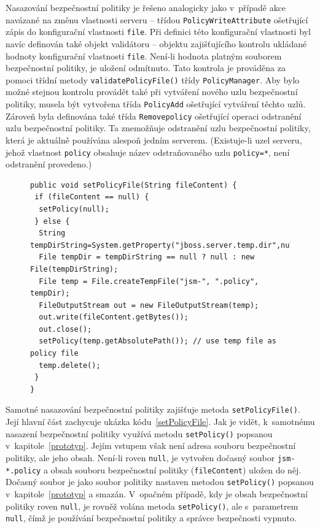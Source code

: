 Nasazování bezpečnostní politiky je řešeno analogicky jako v~případě akce navázané na změnu vlastnosti serveru -- třídou {\tt PolicyWriteAttribute} ošetřující zápis do konfigurační vlastnosti {\tt file}.
Při definici této konfigurační vlastnosti byl navíc definován také objekt validátoru -- objektu zajišťujícího kontrolu ukládané hodnoty konfigurační vlastnosti {\tt file}. Není-li hodnota platným souborem bezpečnostní politiky, je uložení odmítnuto. Tato kontrola je prováděna za pomoci třídní metody {\tt validatePolicyFile()} třídy {\tt PolicyManager}.
Aby bylo možné stejnou kontrolu provádět také při vytváření nového uzlu bezpečnostní politiky, musela být vytvořena třída {\tt PolicyAdd} ošetřující vytváření těchto uzlů.
Zároveň byla definována také třída {\tt Removepolicy} ošetřující operaci odstranění uzlu bezpečnostní politiky. Ta znemožňuje odstranění uzlu bezpečnostní politiky, která je aktuálně používána alespoň jedním serverem. (Existuje-li uzel serveru, jehož vlastnost {\tt policy} obsahuje název odstraňovaného uzlu {\tt policy=*}, není odstranění provedeno.)

\begin{figure}[tbh]
\begin{lstlisting}[caption=Klíčová část metody {\tt setPolicyFile()} třídy {\tt PolicyManager}, label=setPolicyFile]
public void setPolicyFile(String fileContent) {
 if (fileContent == null) {
  setPolicy(null);
 } else {
  String tempDirString=System.getProperty("jboss.server.temp.dir",null);
  File tempDir = tempDirString == null ? null : new File(tempDirString);
  File temp = File.createTempFile("jsm-", ".policy", tempDir);
  FileOutputStream out = new FileOutputStream(temp);
  out.write(fileContent.getBytes());
  out.close();
  setPolicy(temp.getAbsolutePath()); // use temp file as policy file
  temp.delete();
 }
}
\end{lstlisting}
\end{figure}

Samotné nasazování bezpečnostní politiky zajišťuje metoda {\tt setPolicyFile()}. Její hlavní část zachycuje ukázka kódu~\ref{setPolicyFile}.
Jak je vidět, k~samotnému nasazení bezpečnostní politiky využívá metodu {\tt setPolicy()} popsanou v~kapitole~\ref{prototyp}.
Jejím vstupem však není adresa souboru bezpečnostní politiky, ale jeho obsah. Není-li roven {\tt null},
je vytvořen dočasný soubor {\tt jsm-*.policy} a obsah souboru bezpečnostní politiky ({\tt fileContent}) uložen do něj.
Dočasný soubor je jako soubor politiky nastaven metodou {\tt setPolicy()} popsanou v~kapitole~\ref{prototyp} a smazán.
V~opačném případě, kdy je obsah bezpečnostní politiky roven {\tt null}, je rovněž volána metoda {\tt setPolicy()}, ale s~parametrem {\tt null}, čímž je používání bezpečnostní politiky a správce bezpečnosti vypnuto.

